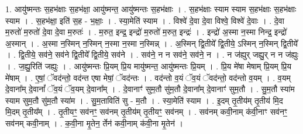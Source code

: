 \documentclass[17pt]{extarticle}
\begin{document}
1. आयु॑ष्मन्तः स॒हभ॑क्षाः स॒हभ॑क्षा॒ आयु॑ष्मन्त॒ आयु॑ष्मन्तः स॒हभ॑क्षाः । . स॒हभ॑क्षाः स्याम स्याम स॒हभ॑क्षाः स॒हभ॑क्षाः स्याम । . स॒हभ॑क्षा॒ इति॑ स॒ह - भ॒क्षाः॒ । . स्या॒मेति॑ स्याम । . विश्वे॑ दे॒वा दे॒वा विश्वे॒ विश्वे॑ दे॒वाः । . दे॒वा म॒रुतो॑ म॒रुतो॑ दे॒वा दे॒वा म॒रुतः॑ । . म॒रुत॒ इन्द्र॒ इन्द्रो॑ म॒रुतो॑ म॒रुत॒ इन्द्रः॑ । . इन्द्रो॑ अ॒स्मा न॒स्मा निन्द्र॒ इन्द्रो॑ अ॒स्मान् । . अ॒स्मा न॒स्मिन् न॒स्मिन् न॒स्मा न॒स्मा न॒स्मिन्न् । . अ॒स्मिन् द्वि॒तीये᳚ द्वि॒तीये॒ ऽस्मिन् न॒स्मिन् द्वि॒तीये᳚ । . द्वि॒तीये॒ सव॑ने॒ सव॑ने द्वि॒तीये᳚ द्वि॒तीये॒ सव॑ने । . सव॑ने॒ न न सव॑ने॒ सव॑ने॒ न । . न ज॑ह्युर् जह्यु॒र् न न ज॑ह्युः । . ज॒ह्यु॒रिति॑ जह्युः । . आयु॑ष्मन्तः प्रि॒यम् प्रि॒य मायु॑ष्मन्त॒ आयु॑ष्मन्तः प्रि॒यम् । . प्रि॒य मे॑षा मेषाम् प्रि॒यम् प्रि॒य मे॑षाम् । . ए॒षां॒ ॅवद॑न्तो॒ वद॑न्त एषा मेषां॒ ॅवद॑न्तः । . वद॑न्तो व॒यं ॅव॒यं ॅवद॑न्तो॒ वद॑न्तो व॒यम् । . व॒यम् दे॒वाना᳚म् दे॒वानां᳚ ॅव॒यं ॅव॒यम् दे॒वाना᳚म् । . दे॒वानाꣳ॑ सुम॒तौ सु॑म॒तौ दे॒वाना᳚म् दे॒वानाꣳ॑ सुम॒तौ । . सु॒म॒तौ स्या॑म स्याम सुम॒तौ सु॑म॒तौ स्या॑म । . सु॒म॒ताविति॑ सु - म॒तौ । . स्या॒मेति॑ स्याम । . इ॒दम् तृ॒तीय॑म् तृ॒तीय॑ मि॒द मि॒दम् तृ॒तीय᳚म् । . तृ॒तीयꣳ॒॒ सव॑नꣳ॒॒ सव॑नम् तृ॒तीय॑म् तृ॒तीयꣳ॒॒ सव॑नम् । . सव॑नम् कवी॒नाम् क॑वी॒नाꣳ सव॑नꣳ॒॒ सव॑नम् कवी॒नाम् । . क॒वी॒ना मृ॒तेन॒ र्तेन॑ कवी॒नाम् क॑वी॒ना मृ॒तेन॑ । \newline
\end{document}
